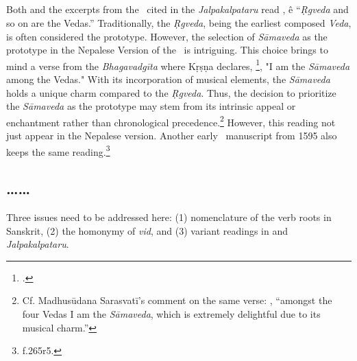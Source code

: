 \subsection{}
	
Both \SuComma{}{} and the excerpts from the \SS\ cited in the \emph{Jalpakalpataru} read , ê
“\emph{Ṛgveda} and so on are the Vedas.” 
 Traditionally, the \emph{Ṛgveda}, being the earliest composed \emph{Veda}, 
is often considered the prototype. 
However, the selection of \emph{Sāmaveda} as the prototype in the Nepalese Version of the \SS\ is intriguing. 
This choice brings to mind a verse from the \emph{Bhagavadgīta} where Kṛṣṇa declares, 
\footcite[10.22][456]{pans-1936}, 
"I am the \emph{Sāmaveda} among the Vedas." 
With its incorporation of musical elements, 
the \emph{Sāmaveda} holds a unique charm compared to the \emph{Ṛgveda}. 
Thus, the decision to prioritize the \emph{Sāmaveda} as the prototype 
	may stem from its intrinsic appeal or enchantment rather than chronological precedence.\footnote{
	Cf. Madhusūdana Sarasvatī's comment on the same verse: 
	\parencite[10.22][456]{pans-1936}, 
	“amongst the four Vedas I am the \emph{Sāmaveda}, which is extremely delightful due to its musical charm.”}
However, this reading not just appear in the Nepalese version. 
Another early \SS\ manuscript from 1595 also keeps the same reading.\footnote{ f.265r5.}
	 
\subsection{\ldots{}\ldots}
	 
Three issues need to be addressed here: 
	(1) nomenclature of the verb roots in Sanskrit, 
	(2) the homonymy of \emph{vid}, and 
	(3) variant readings in \SuComma{}{} and \emph{Jalpakalpataru}. 
	 		
